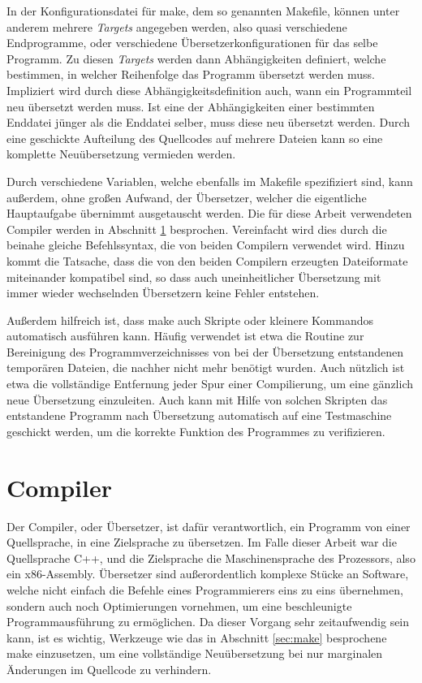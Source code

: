 In der Konfigurationsdatei für make, dem so genannten Makefile, können unter anderem mehrere \textit{Targets} angegeben werden, also quasi verschiedene Endprogramme, oder verschiedene
Übersetzerkonfigurationen für das selbe Programm. Zu diesen \textit{Targets} werden dann Ab\-hängig\-keiten definiert, welche bestimmen, in welcher Reihenfolge das Programm übersetzt werden 
muss. Impliziert wird durch diese Abhängigkeitsdefinition auch, wann ein Programmteil neu übersetzt werden muss. Ist eine der Abhängigkeiten einer bestimmten Enddatei jünger als die 
Enddatei selber, muss diese neu übersetzt werden. Durch eine geschickte Aufteilung des Quellcodes auf mehrere Dateien kann so eine komplette Neuübersetzung vermieden werden. 

Durch verschiedene Variablen, welche ebenfalls im Makefile spezifiziert sind, kann außerdem, ohne großen Aufwand, der Übersetzer, welcher die eigentliche Hauptaufgabe übernimmt ausgetauscht werden.
Die für diese Arbeit verwendeten Compiler werden in Abschnitt \ref{sec:compiler} besprochen. Vereinfacht wird dies durch die beinahe gleiche Befehlssyntax, die von beiden Compilern verwendet wird.
Hinzu kommt die Tatsache, dass die von den beiden Compilern erzeugten Dateiformate miteinander kompatibel sind, so dass auch uneinheitlicher Übersetzung mit immer wieder wechselnden Übersetzern
keine Fehler entstehen.

Außerdem hilfreich ist, dass make auch Skripte oder kleinere Kommandos automatisch aus\-füh\-ren kann. Häufig verwendet ist etwa die Routine zur Bereinigung des Programmverzeichnisses von bei der
Übersetzung entstandenen temporären Dateien, die nachher nicht mehr benötigt wurden. Auch nützlich ist etwa die vollständige Entfernung jeder Spur einer Compilierung, um eine gänzlich neue
Übersetzung einzuleiten. Auch kann mit Hilfe von solchen Skripten das entstandene Programm nach Übersetzung automatisch auf eine Testmaschine geschickt werden, um die korrekte Funktion
des Programmes zu verifizieren.

\section{Compiler}
\label{sec:compiler}
Der Compiler, oder Übersetzer, ist dafür verantwortlich, ein Programm von einer Quellsprache, in eine Zielsprache zu übersetzen. Im Falle dieser Arbeit war die Quellsprache C++, und die
Zielsprache die Maschinensprache des Prozessors, also ein x86-Assembly. Übersetzer sind außerordentlich komplexe Stücke an Software, welche nicht einfach die Befehle eines Programmierers eins zu
eins übernehmen, sondern auch noch Optimierungen vornehmen, um eine beschleunigte Programmausführung zu ermöglichen. Da dieser Vorgang sehr zeitaufwendig sein kann, ist es wichtig, Werkzeuge wie
das in Abschnitt \ref{sec:make} besprochene make einzusetzen, um eine vollständige Neuübersetzung bei nur marginalen Änderungen im Quellcode zu verhindern. 

